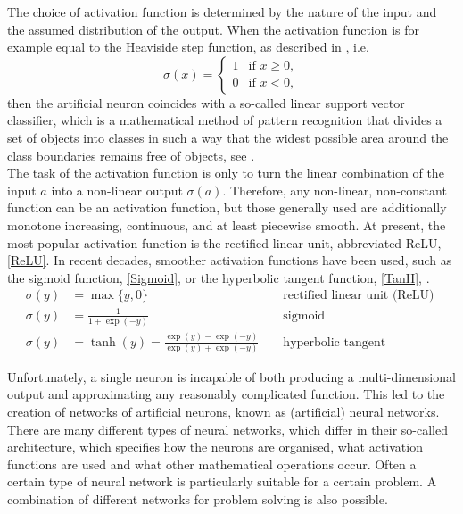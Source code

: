 The choice of activation function is determined by the nature of the input and the assumed distribution of the output. When the activation function is for example equal to the Heaviside step function, as described in \cite{Rosenblatt:1958}, i.e.
\begin{equation*}
    \sigma(x) = \begin{cases} 1 & \text{if } x \geq 0, \\ 0 & \text{if } x < 0, \end{cases}
\end{equation*}
then the artificial neuron coincides with a so-called linear support vector classifier, which is a mathematical method of pattern recognition that divides a set of objects into classes in such a way that the widest possible area around the class boundaries remains free of objects, see \cite[Chapter~7]{Bishop:2006}. \\
The task of the activation function is only to turn the linear combination of the input $a$ into a non-linear output $\sigma(a)$. Therefore, any non-linear, non-constant function can be an activation function, but those generally used are additionally monotone increasing, continuous, and at least piecewise smooth. At present, the most popular activation function is the rectified linear unit, abbreviated ReLU, \cref{ReLU}. In recent decades, smoother activation functions have been used, such as the sigmoid function, \cref{Sigmoid}, or the hyperbolic tangent function, \cref{TanH}, \cite[p.~3]{LeCunBengioHinton:2015}.
\begin{align}
    \sigma(y) &=\max \{y, 0\} & & \text{ rectified linear unit (ReLU) } \label{ReLU} \\
    \sigma(y) &=\frac{1}{1+\exp (-y)} & & \text{ sigmoid } \label{Sigmoid} \\
    \sigma(y) &=\tanh (y)=\frac{\exp (y)-\exp (-y)}{\exp (y)+\exp (-y)} & & \text{ hyperbolic tangent } \label{TanH}
\end{align}

Unfortunately, a single neuron is incapable of both producing a multi-dimensional output and approximating any reasonably complicated function. This led to the creation of networks of artificial neurons, known as (artificial) neural networks. There are many different types of neural networks, which differ in their so-called architecture, which specifies how the neurons are organised, what activation functions are used and what other mathematical operations occur. Often a certain type of neural network is particularly suitable for a certain problem. A combination of different networks for problem solving is also possible. 


